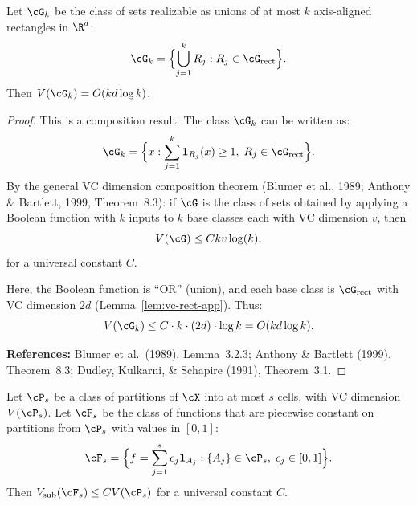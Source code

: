 \begin{lemma}
\label{lem:vc-union-app}
Let $\cG_k$ be the class of sets realizable as unions of at most $k$ axis-aligned rectangles in $\R^d$:
\[
\cG_k = \Bigl\{ \bigcup_{j=1}^k R_j : R_j \in \cG_{\text{rect}} \Bigr\}.
\]
Then $V(\cG_k) = O(kd \log k)$.
\end{lemma}

\begin{proof}
This is a composition result. The class $\cG_k$ can be written as:
\[
\cG_k = \Bigl\{ x : \sum_{j=1}^k \mathbf{1}_{R_j}(x) \ge 1, \; R_j \in \cG_{\text{rect}} \Bigr\}.
\]
By the general VC dimension composition theorem (Blumer et al., 1989; Anthony \& Bartlett, 1999, Theorem~8.3): if $\cG$ is the class of sets obtained by applying a Boolean function with $k$ inputs to $k$ base classes each with VC dimension $v$, then
\[
V(\cG) \le C k v \log(k),
\]
for a universal constant $C$.

Here, the Boolean function is ``OR'' (union), and each base class is $\cG_{\text{rect}}$ with VC dimension $2d$ (Lemma~\ref{lem:vc-rect-app}). Thus:
\[
V(\cG_k) \le C \cdot k \cdot (2d) \cdot \log k = O(kd \log k).
\]

\textbf{References:} Blumer et al.\ (1989), Lemma~3.2.3; Anthony \& Bartlett (1999), Theorem~8.3; Dudley, Kulkarni, \& Schapire (1991), Theorem~3.1.
\end{proof}

\begin{lemma}
\label{lem:pseudo-partition}
Let $\cP_s$ be a class of partitions of $\cX$ into at most $s$ cells, with VC dimension $V(\cP_s)$. Let $\cF_s$ be the class of functions that are piecewise constant on partitions from $\cP_s$ with values in $[0,1]$:
\[
\cF_s = \Bigl\{ f = \sum_{j=1}^s c_j \mathbf{1}_{A_j} : \{A_j\} \in \cP_s, \; c_j \in [0,1] \Bigr\}.
\]
Then $V_{\text{sub}}(\cF_s) \le C V(\cP_s)$ for a universal constant $C$.
\end{lemma}

